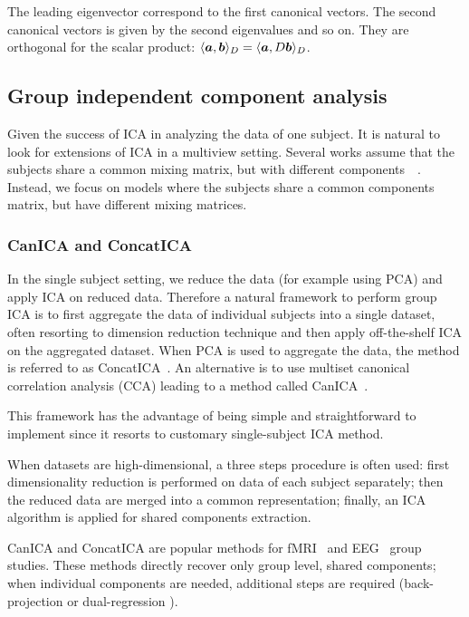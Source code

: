     The leading eigenvector correspond to the first canonical vectors. The
    second canonical vectors is given by the second eigenvalues and so on. They
    are orthogonal for the scalar product: $\langle \boldsymbol{a}, \boldsymbol{b}  \rangle_D =
    \langle \boldsymbol{a}, D \boldsymbol{b}  \rangle_D$.

  
\subsection{Group independent component analysis}
\label{sec:groupica}
Given the success of ICA in analyzing the data of one subject. It is natural to
look for extensions of ICA in a multiview setting.
Several works assume that the subjects share a common mixing matrix, but with different components~\cite{pfister2019robustifying}~\cite{svensen2002ica}.
% 
Instead, we focus on models where the subjects share a common components matrix, but have different mixing matrices.

\subsubsection{CanICA and ConcatICA}
\label{sec:canicaandconcatica}
In the single subject setting, we reduce the data (for example using PCA) and apply ICA on
reduced data. Therefore a natural framework to perform group ICA is to first aggregate the
data of individual subjects into a single dataset, often resorting to dimension
reduction technique and then apply off-the-shelf ICA on the aggregated dataset.
When PCA is used to aggregate the data, the method is referred to as
ConcatICA~\cite{calhoun2001method}. An alternative is to use multiset canonical
correlation analysis (CCA) leading to a method called CanICA~\cite{varoquaux2009canica}.

This framework has the advantage of being simple and
straightforward to implement since it resorts to customary single-subject
ICA method.

When datasets are high-dimensional, a three steps procedure is often used: first
dimensionality reduction is performed on data of each subject  separately; then
the reduced data are merged into a common representation; finally, an ICA
algorithm is applied for shared components extraction.

CanICA and ConcatICA are popular methods for fMRI~\cite{calhoun2009review} and EEG~\cite{eichele2011eegift} group studies. These methods directly recover only group level, shared components; when individual components are needed, additional steps are required (back-projection \cite{calhoun2001method} or dual-regression \cite{beckmann2009group}).
% 

